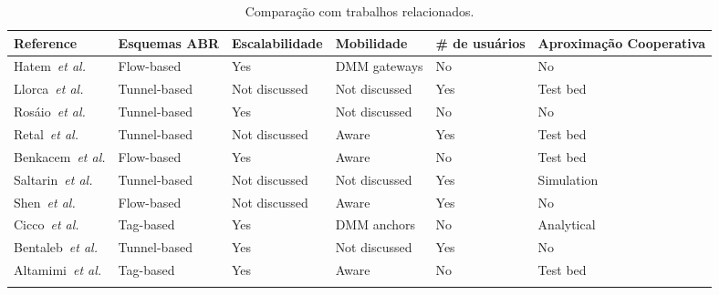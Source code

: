 \begin{table}[htb]
  \caption{Comparação com trabalhos relacionados.}
  \label{tab:comparison}
  \centering
  \scriptsize
  \begin{tabular}{p{2.8cm}p{2cm}p{2cm}p{2.2cm}p{2cm}p{2cm}}
    \toprule
    \textbf{Reference} &
    \textbf{Esquemas ABR} &
    \textbf{Escalabilidade} &
    \textbf{Mobilidade} &
    \textbf{\# de \newline usuários} &
    \textbf{Aproximação \newline Cooperativa} \\
    \midrule

    Hatem~\textit{et al.}~\cite{Ahmad2013a, Ahmad2013b} &
    Flow-based & Yes & \ac{DMM} gateways & No & No \\
    \addlinespace
    \addlinespace

    Llorca~\textit{et al.}~\cite{Banerjee2013} &
    Tunnel-based & Not discussed & Not discussed & Yes & Test bed \\
    \addlinespace
	\addlinespace
    Rosáio~\textit{et al.}~\cite{Basta2013a, Basta2014} &
    Tunnel-based & Yes & Not discussed & No & No \\
    \addlinespace
	\addlinespace
    Retal~\textit{et al.} \cite{Cho2014} &
    Tunnel-based & Not discussed & Aware & Yes & Test bed \\
    \addlinespace
	\addlinespace
    Benkacem~\textit{et al.} \cite{CostaRequena2014} &
    Flow-based & Yes & Aware & No & Test bed \\
    \addlinespace
	\addlinespace
    Saltarin~\textit{et al.} \cite{Ghazisaeedi2013} &
    Tunnel-based & Not discussed & Not discussed & Yes & Simulation \\
    \addlinespace
	\addlinespace
    Shen~\textit{et al.} \cite{Guerzoni2014} &
    Flow-based & Not discussed & Aware & Yes & No \\
    \addlinespace
	\addlinespace


    Cicco~\textit{et al.} \cite{Gurusanthosh2013} &
    Tag-based & Yes & \ac{DMM} anchors & No & Analytical \\
    \addlinespace
	\addlinespace
	
    Bentaleb~\textit{et al.} \cite{Hampel2013} &
    Tunnel-based & Yes & Not discussed & Yes & No \\
    \addlinespace
	\addlinespace
	
    Altamimi~\textit{et al.} \cite{Jin2013a} &
    Tag-based & Yes & Aware & No & Test bed \\
    \addlinespace
	\addlinespace
	

\end{tabular}
\end{table}
